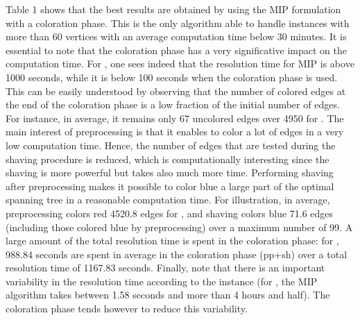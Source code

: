 \documentclass[final,3p,times]{elsarticle}
\begin{document}
Table 1 shows that the best results are obtained by using the MIP formulation with a coloration phase. This is the only algorithm able to handle instances with more than 60 vertices with an average computation time below 30 minutes. It is essential to note that the coloration phase has a very significative impact on the computation time. For , one sees indeed that the resolution time for MIP is above 1000 seconds, while it is below 100 seconds when the coloration phase is used. This can be easily understood by observing that the number of colored edges at the end of the coloration phase is a low fraction of the initial number of edges. For instance, in average, it remains only 67 uncolored edges over 4950 for . The main interest of preprocessing is that it enables to color a lot of edges in a very low computation time. Hence, the number of edges that are tested during the shaving procedure is reduced, which is computationally interesting since the shaving is more powerful but takes also much more time. Performing shaving after preprocessing makes it possible to color blue a large part of the optimal spanning tree in a reasonable computation time.  For illustration, in average,  preprocessing colors red 4520.8 edges for , and shaving colors blue 71.6 edges (including those colored blue by preprocessing) over a maximum number of 99. A large amount of the total resolution time is spent in the coloration phase: for , 988.84 seconds are spent in average in the coloration phase (pp+sh) over a total resolution time of 1167.83 seconds. Finally, note that there is an important variability in the resolution time according to the instance (for , the MIP algorithm takes between 1.58 seconds and more than 4 hours and half). The coloration phase tends however to reduce this variability.
\end{document}
